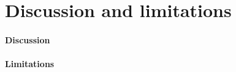 \section{Discussion and limitations}
\label{sec:discussion and limitations}

\paragraph{Discussion}


\paragraph{Limitations}


